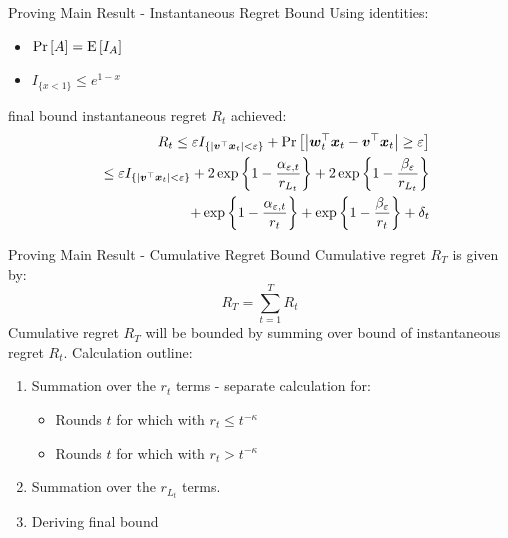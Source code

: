\documentclass{beamer}
\begin{document}
\begin{frame}{Proving Main Result - Instantaneous Regret Bound}
Using identities:\newline
\begin{itemize}
\item ${\rm Pr}\left[{A}\right]={\rm E}\left[{I_A}\right]$
\item $I_{\{x<1\}}\leq e^{1-x}$\newline
\end{itemize}
final bound instantaneous regret $R_t$ achieved:
\begin{eqnarray*}
&&R_t\leq\varepsilon I_{\{\left|{{\boldsymbol{v}}}^{\top}{\boldsymbol{x}}_{t}\right|<\varepsilon\}}+ {\rm Pr}\left[{\left|{{\boldsymbol{w}}}^{\top}_{t}{\boldsymbol{x}}_{t}-{{\boldsymbol{v}}}^{\top}{\boldsymbol{x}}_{t}\right|\geq\varepsilon}\right]\\
&&\leq\varepsilon I_{\{\left|{{\boldsymbol{v}}}^{\top}{\boldsymbol{x}}_{t}\right|<\varepsilon\}}+ 2\exp\left\{1-\frac{\alpha_{\varepsilon,t}}{r_{L_t}}\right\}+2\exp\left\{1-\frac{\beta_{\varepsilon}}{r_{L_t}}\right\}\nonumber\\
&&+\exp\left\{1-\frac{\alpha_{\varepsilon,t}}{r_t}\right\}+\exp\left\{1-\frac{\beta_{\varepsilon}}{r_t}\right\}+\delta_t\nonumber
\label{exponent_regret_class}
\end{eqnarray*}
\end{frame}



\begin{frame}{Proving Main Result - Cumulative Regret Bound}
Cumulative regret $R_T$ is given by:
\begin{equation*}
R_T=\sum\limits_{t=1}^{T}R_t
\label{cum_reg_define}
\end{equation*}
Cumulative regret $R_T$ will be bounded by summing over bound of instantaneous regret $R_t$. \newline\newline Calculation outline:\newline
\begin{enumerate}
\item Summation over the $r_t$ terms - separate calculation for:
\begin{itemize}
\item Rounds $t$ for which with $r_t\leq t^{-\kappa}$
\item Rounds $t$ for which with $r_t> t^{-\kappa}$
\end{itemize}
\item Summation over the $r_{L_t}$ terms.
\item Deriving final bound
\end{enumerate}
\end{frame}
\end{document}

